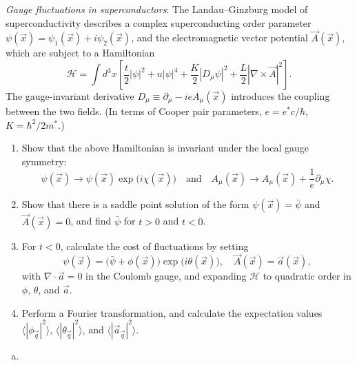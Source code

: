 \begin{problem}
    \textit{Gauge fluctuations in superconductors}: The Landau--Ginzburg model of superconductivity describes a complex superconducting order parameter $\psi(\vec{x}) = \psi_1(\vec{x}) + i\psi_2(\vec{x})$, and the electromagnetic vector potential $\vec{A}(\vec{x})$, which are subject to a Hamiltonian
    \[
        \mathcal{H} = \int d^3x\left[\frac{t}{2}|\psi|^2 + u|\psi|^4 + \frac{K}{2}|D_\mu\psi|^2 + \frac{L}{2}|\nabla\times\vec{A}|^2\right].
    \]
    The gauge-invariant derivative $D_\mu \equiv \partial_\mu - ieA_\mu(\vec{x})$ introduces the coupling between the two fields. (In terms of Cooper pair parameters, $e = e^*c/\hbar$, $K = \hbar^2/2m^*$.)

    \begin{enumerate}
        \item[(a)] Show that the above Hamiltonian is invariant under the local gauge symmetry:
        \[
            \psi(\vec{x}) \to \psi(\vec{x})\exp\!\bigl(i\chi(\vec{x})\bigr) \quad \text{and} \quad A_\mu(\vec{x}) \to A_\mu(\vec{x}) + \frac{1}{e}\partial_\mu\chi.
        \]

        \item[(b)] Show that there is a saddle point solution of the form $\psi(\vec{x}) = \bar{\psi}$ and $\vec{A}(\vec{x}) = 0$, and find $\bar{\psi}$ for $t > 0$ and $t < 0$.

        \item[(c)] For $t < 0$, calculate the cost of fluctuations by setting
        \[
            \psi(\vec{x}) = \bigl(\bar{\psi} + \phi(\vec{x})\bigr)\exp\!\bigl(i\theta(\vec{x})\bigr), \quad \vec{A}(\vec{x}) = \vec{a}(\vec{x}),
        \]
        with $\nabla\cdot\vec{a} = 0$ in the Coulomb gauge, and expanding $\mathcal{H}$ to quadratic order in $\phi$, $\theta$, and $\vec{a}$.

        \item[(d)] Perform a Fourier transformation, and calculate the expectation values $\langle|\phi_{\vec{q}}|^2\rangle$, $\langle|\theta_{\vec{q}}|^2\rangle$, and $\langle|\vec{a}_{\vec{q}}|^2\rangle$.
    \end{enumerate}
\end{problem}

\begin{solution}
    \begin{enumerate}[(a)]
        \item
    \end{enumerate}
\end{solution}

